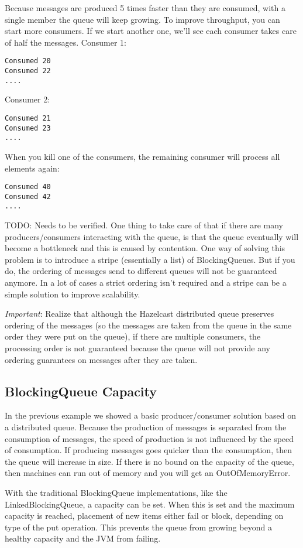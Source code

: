 Because messages are produced 5 times faster than they are consumed, with a single member the queue will keep growing. To improve throughput, you can start more consumers. If we start another one, we'll see each consumer takes care of half the messages. Consumer 1:
\begin{lstlisting}
Consumed 20
Consumed 22
....
\end{lstlisting}
Consumer 2:
\begin{lstlisting}
Consumed 21
Consumed 23
....
\end{lstlisting}
When you kill one of the consumers, the remaining consumer will process all elements again:
\begin{lstlisting}
Consumed 40  
Consumed 42 
....
\end{lstlisting}

TODO: Needs to be verified.
One thing to take care of that if there are many producers/consumers interacting with the queue, is that the queue eventually will become a bottleneck and this is caused by contention. One way of solving this problem is to introduce a stripe (essentially a list) of BlockingQueues. But if you do, the ordering of messages send to different queues will not be guaranteed anymore. In a lot of cases a strict ordering isn't required and a stripe can be a simple solution to improve scalability.

\emph{Important}: Realize that although the Hazelcast distributed queue preserves ordering of the messages (so the messages are taken from the queue in the same order they were put on the queue), if there are multiple consumers, the processing order is not guaranteed because the queue will not provide any ordering guarantees on messages after they are taken.

\subsection{BlockingQueue Capacity}
In the previous example we showed a basic producer/consumer solution based on a distributed queue. Because the production of messages is separated from the consumption of messages, the speed of production is not influenced by the speed of consumption. If producing messages goes quicker than the consumption, then the queue will increase in size. If there is no bound on the capacity of the queue, then machines can run out of memory and you will get an OutOfMemoryError. 

With the traditional BlockingQueue implementations, like the LinkedBlockingQueue, a capacity can be set. When this is set and the maximum capacity is reached, placement of new items either fail or block, depending on type of the put operation. This prevents the queue from growing beyond a healthy capacity and the JVM from failing.

